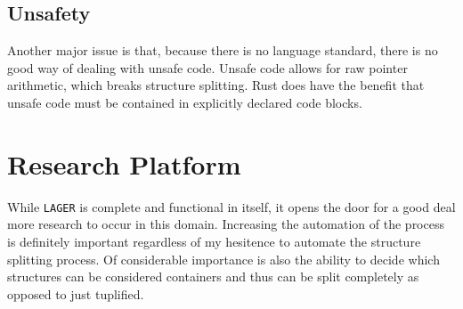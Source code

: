 \documentclass[12pt,oneside]{book}
\newcommand{\projectname}{{\texttt{LAGER}}}
\def \name{\projectname\xspace}
\begin{document}
\section{Unsafety}
\label{sec:unsafe}


Another major issue is that, because there is no language standard, there is no
good way of dealing with unsafe code. Unsafe code allows for raw pointer
arithmetic, which breaks structure splitting. Rust does have the benefit that
unsafe code must be contained in explicitly declared code blocks.

\chapter{Research Platform}

While \name is complete and functional in itself, it opens the door for 
a good deal more research to occur in this domain. Increasing the automation
of the process is definitely important regardless of my hesitence to automate
the structure splitting process. Of considerable importance is also
the ability to decide which structures can be considered containers and thus 
can be split completely as opposed to just tuplified.





\end{document}
